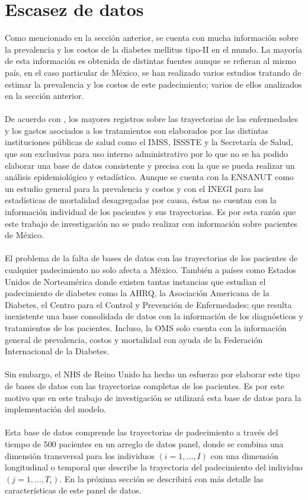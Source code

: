 \section{Escasez de datos}
Como mencionado en la secci\'on anterior, se cuenta con mucha informaci\'on sobre la prevalencia y los costos de la diabetes mellitus tipo-II en el mundo. La mayor\'ia de esta informaci\'on es obtenida de distintas fuentes aunque se refieran al mismo pa\'is, en el caso particular de M\'exico, se han realizado varios estudios tratando de estimar la prevalencia y los costos de este padecimiento; varios de ellos analizados en la secci\'on anterior.\\
\\
De acuerdo con \cite{barquera2013diabetes}, los mayores registros sobre las trayectorias de las enfermedades y los gastos asociados a los tratamientos son elaborados por las distintas instituciones p\'ublicas de salud como el IMSS, ISSSTE y la Secretar\'ia de Salud, que son exclusivas para uso interno administrativo por lo que no se ha podido elaborar una base de datos consistente y precisa con la que se pueda realizar un an\'alisis epidemiol\'ogico y estad\'istico. Aunque se cuenta con la ENSANUT como un estudio general para la prevalencia y costos y con el INEGI para las estad\'isticas de mortalidad desagregadas por causa, \'estas no cuentan con la informaci\'on individual de los pacientes y sus trayectorias. Es por esta raz\'on que este trabajo de investigaci\'on no se pudo realizar con informaci\'on sobre pacientes de M\'exico.\\
\\
El problema de la falta de bases de datos con las trayectorias de los pacientes de cualquier padecimiento no solo afecta a M\'exico. Tambi\'en a pa\'ises como Estados Unidos de Norteam\'erica donde existen tantas instancias que estudian el padecimiento de diabetes como la AHRQ, la Asociaci\'on Americana de la Diabetes, el Centro para el Control y Prevenci\'on de Enfermedades; que resulta inexistente una base consolidada de datos con la informaci\'on de los diagn\'osticos y tratamientos de los pacientes. Incluso, la OMS solo cuenta con la informaci\'on general de prevalencia, costos y mortalidad con ayuda de la Federaci\'on Internacional de la Diabetes.\\
\\
Sin embargo, el NHS de Reino Unido ha hecho un esfuerzo por elaborar este tipo de bases de datos con las trayectorias completas de los pacientes. Es por este motivo que en este trabajo de investigaci\'on se utilizar\'a esta base de datos para la implementaci\'on del modelo.\\
\\
Esta base de datos comprende las trayectorias de padecimiento a trav\'es del tiempo de 500 pacientes en un arreglo de datos panel, donde se combina una dimensi\'on transversal para los individuos $(i=1,...,I)$ con una dimensi\'on longitudinal o temporal que describe la trayectoria del padecimiento del individuo $(j=1,...,T_i)$. En la pr\'oxima secci\'on se describir\'a con m\'as detalle las caracter\'isticas de este panel de datos.
